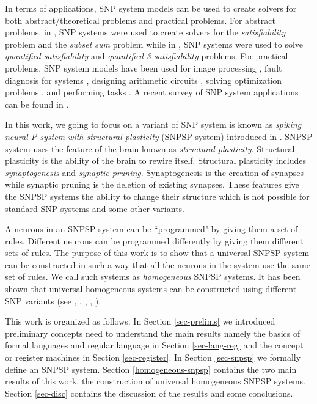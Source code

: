 \documentclass[smallextended]{svjour3}
\begin{document}
In terms of applications, SNP system models can be used to create solvers for both abstract/theoretical
problems and practical problems. For abstract problems, in \cite{leporati-2008-snp-sat-subset-sum}, 
SNP systems were used to create solvers for the \emph{satisfiability} problem and the \emph{subset sum} problem
while in \cite{ishdorj-2010-snp-qsat-q3sat}, SNP systems were used to solve \emph{quantified satisfiability}
and \emph{quantified 3-satisfiability} problems. For practical problems, SNP system models have been
used for image processing \cite{diaz-pernil-2019-mc-image-proc,diaz-pernil-2013-snp-skeleton,song-2019-snp-weights-skeleton},
fault diagnosis for systems \cite{peng-2013-fuzzy-snp,peng-2013-fuzzy-snp-fault},
designing arithmetic circuits \cite{ochirbat-2020-snp-adder,xu-2014-snp-arithmetic-circuits},
solving optimization problems \cite{zhang-2014-optimization-snp}, and performing tasks \cite{song-2019-learning-functions}.
A recent survey of SNP system  applications can be found in \cite{fan-2020-snp-app-survey}.

In this work, we going to focus on a variant of SNP system is known as \textit{spiking neural P system with structural plasticity} (SNPSP system) 
introduced in \cite{cabarle-2015-structural-plasticity}. SNPSP system uses the feature of the brain known as  \textit{structural plasticity}. Structural plasticity is the ability
of the brain to rewire itself. Structural plasticity includes \textit{synaptogenesis} and \textit{synaptic pruning}. Synaptogenesis is the creation of 
synapses while synaptic pruning is the deletion of existing synapses. These features give the SNPSP systems the ability to change their structure 
which is not possible for standard SNP systems and some other variants.

A neurons in an SNPSP system can be ``programmed" by giving them a set of rules. Different neurons can be programmed differently by giving them 
different sets of rules. The purpose of this work is to show that a universal SNPSP system can be constructed in such a way that all the neurons in
the system use the same set of rules. We call such systems as \textit{homogeneous} SNPSP systems. It has been shown that universal homogeneous systems
can be constructed using different SNP variants (see \cite{HSNP}, \cite{HISNP}, \cite{HSNP-R}, \cite{HSNP-S}, \cite{HSNP-A}).

This work is organized as follows: In Section \ref{sec-prelims} we introduced preliminary concepts need to understand the main results namely the
basics of formal languages and regular language in Section \ref{sec-lang-reg} and the concept or register machines in Section \ref{sec-register}. In
Section \ref{sec-snpsp} we formally define an SNPSP system. Section \ref{homogeneous-snpsp} contains the two main results of this work, the 
construction of universal homogeneous SNPSP systems. Section \ref{sec-disc} contains the discussion of the results and some conclusions.
\end{document}
